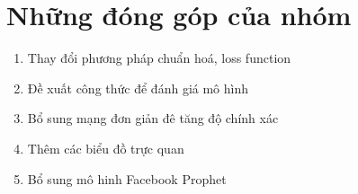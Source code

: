 \chapter{Những đóng góp của nhóm}
\label{sec:contribute}
\begin{enumerate}
    \item Thay đổi phương pháp chuẩn hoá, loss function
    \item Đề xuất công thức để đánh giá mô hình
    \item Bổ sung mạng đơn giản đê tăng độ chính xác
    \item Thêm các biểu đồ trực quan
    \item Bổ sung mô hinh Facebook Prophet
\end{enumerate}